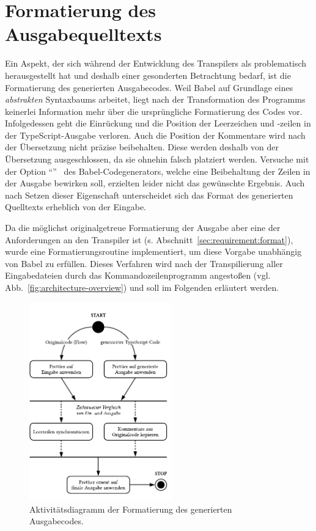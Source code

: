 {\section{Formatierung des Ausgabequelltexts}
\label{sec:formatting}

Ein Aspekt, der sich während der Entwicklung des Transpilers als problematisch herausgestellt hat und deshalb einer gesonderten Betrachtung bedarf, ist die Formatierung des generierten Ausgabecodes. Weil Babel auf Grundlage eines \emph{abstrakten} Syntaxbaums arbeitet, liegt nach der Transformation des Programms keinerlei Information mehr über die ursprüngliche Formatierung des Codes vor. Infolgedessen geht die Einrückung und die Position der Leerzeichen und -zeilen in der TypeScript-Ausgabe verloren. Auch die Position der Kommentare wird nach der Übersetzung nicht präzise beibehalten. Diese werden deshalb von der Übersetzung ausgeschlossen, da sie ohnehin falsch platziert werden. Versuche mit der Option \enquote{}~\autocite{BABEL:GENERATOR} des Babel-Codegenerators, welche eine Beibehaltung der Zeilen in der Ausgabe bewirken soll, erzielten leider nicht das gewünschte Ergebnis. Auch nach Setzen dieser Eigenschaft unterscheidet sich das Format des generierten Quelltexts erheblich von der Eingabe.

Da die möglichst originalgetreue Formatierung der Ausgabe aber eine der Anforderungen an den Transpiler ist (s. Abschnitt~\ref{sec:requirement:format}), wurde eine Formatierungsroutine implementiert, um diese Vorgabe unabhängig von Babel zu erfüllen. Dieses Verfahren wird nach der Transpilierung aller Eingabedateien durch das Kommandozeilenprogramm angestoßen (vgl. Abb.~\ref{fig:architecture-overview}) und soll im Folgenden erläutert werden.

\begin{figure}[htb]
  \centering
  \includegraphics[width=0.55\textwidth]{src/4_Umsetzung/fig/activity-diagram-formatting.pdf}
  \caption[Aktivitätsdiagramm der Formatierung des Ausgabecodes]{Aktivitätsdiagramm der Formatierung des generierten Ausgabecodes.}
  \label{fig:activity-diagram-formatting}
\end{figure}

}
